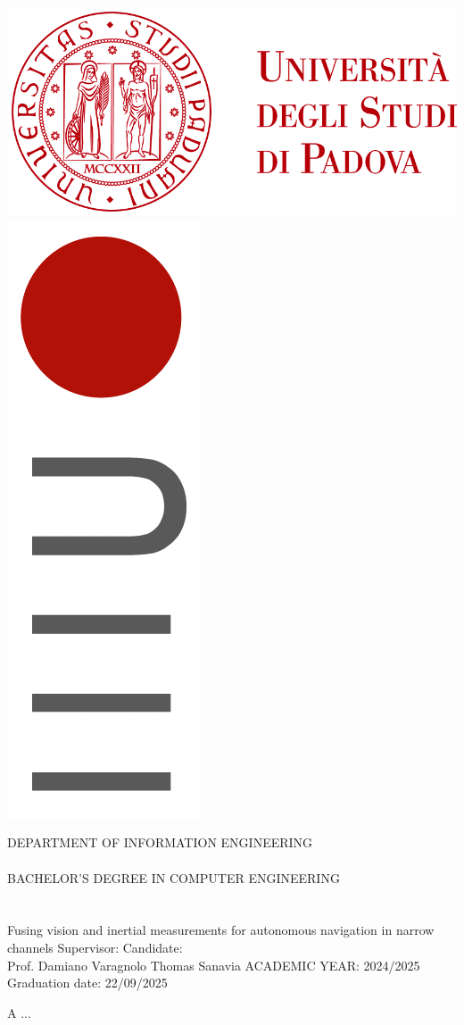 \documentclass[a4paper,12pt,twoside,openright]{book}
\begin{document}
\frontmatter
\begin{titlepage}
	\begin{flushleft}
		\includegraphics[width=0.3\columnwidth]{images/logo_unipd.png}
		\hspace{\fill}
		\includegraphics[width=0.05\columnwidth]{images/logo_DEI.png}
		\hspace{0.01 cm}
		\begin{minipage}[b][1,8 cm][c]{0.3\columnwidth}
			\textsf{{\color{Sepia}{DIPARTIMENTO\\DI INGEGNERIA\\DELL'INFORMAZIONE}}}
		\end{minipage}
	\end{flushleft}
	
	\vfill
	\begin{center}
		\begin{large}
			DEPARTMENT OF INFORMATION ENGINEERING
			\\~\\
			BACHELOR'S DEGREE IN COMPUTER ENGINEERING
			\\~\\~\\
			Fusing vision and inertial measurements for autonomous navigation in narrow channels
			\vfill
			Supervisor: 
			\hfill
			Candidate:
			\\
			Prof. Damiano Varagnolo
			\hfill
			Thomas Sanavia
			\vfill
			ACADEMIC YEAR: 2024/2025
			\\
			Graduation date: 22/09/2025
			\vfill
		\end{large}
	\end{center}
	
\end{titlepage}


\cleardoublepage %
\thispagestyle{empty} %

\null
\vspace{2cm}
\begin{flushright}
A ...
\end{flushright}
\vfill
\end{document}

